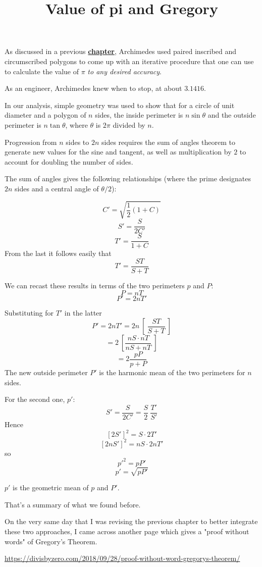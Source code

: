 \documentclass[11pt, oneside]{article}
\title{Value of pi and Gregory}
\date{}
\begin{document}
\maketitle
\Large
\label{sec:Gregory}

As discussed in a previous \hyperref[sec:Archimedes_and_pi]{\textbf{chapter}}, Archimedes used paired inscribed and circumscribed polygons to come up with an iterative procedure that one can use to calculate the value of $\pi$ \emph{to any desired accuracy}.  

As an engineer, Archimedes knew when to stop, at about $3.1416$.

In our analysis, simple geometry was used to show that for a circle of unit diameter and a polygon of $n$ sides, the inside perimeter is $n \sin \theta$ and the outside perimeter is $n \tan \theta$, where $\theta$ is $2 \pi$ divided by $n$.  

Progression from $n$ sides to $2n$ sides requires the sum of angles theorem to generate new values for the sine and tangent, as well as multiplication by $2$ to account for doubling the number of sides.

The sum of angles gives the following relationships (where the prime designates $2n$ sides and a central angle of $\theta/2$):

\[ C' = \sqrt{\frac{1}{2}(1 + C)} \]
\[ S' = \frac{S}{2C'} \] 
\[ T' = \frac{S}{1 + C} \]
From the last it follows easily that
\[ T' = \frac{ST}{S + T} \]

We can recast these results in terms of the two perimeters $p$ and $P$:
\[ P = nT  \]
\[ P' = 2nT' \]

Substituting for $T'$ in the latter
\[ P' = 2nT' = 2n \ [ \  \frac{ST}{S + T} \ ] \]
\[ = 2 \ [ \frac{nS \cdot nT}{nS + nT} \ ] \]
\[ = 2 \frac{pP}{p + P} \]
The new outside perimeter $P'$ is the harmonic mean of the two perimeters for $n$ sides.

For the second one, $p'$:
\[ S' = \frac{S}{2C'} = \frac{S}{2} \ \frac{T'}{S'} \]
Hence
\[ [2S']^2 = S \cdot 2T' \]
\[ [2nS']^2 = nS \cdot 2nT' \]
so
\[ p'^2 = pP' \]
\[ p' = \sqrt{pP'} \]

$p'$ is the geometric mean of $p$ and $P'$.

That's a summary of what we found before.

On the very same day that I was revising the previous chapter to better integrate these two approaches, I came across another page which gives a "proof without words" of Gregory's Theorem.

\url{https://divisbyzero.com/2018/09/28/proof-without-word-gregorys-theorem/}
\end{document}
